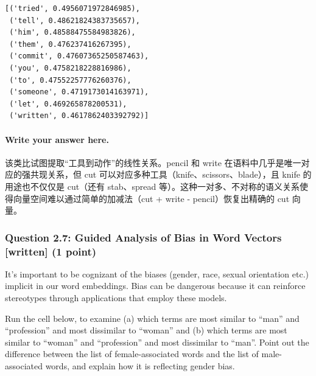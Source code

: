 \documentclass[11pt]{article}
\begin{document}
    \begin{Verbatim}[commandchars=\\\{\}]
[('tried', 0.4956071972846985),
 ('tell', 0.48621824383735657),
 ('him', 0.48588475584983826),
 ('them', 0.476237416267395),
 ('commit', 0.47607365250587463),
 ('you', 0.4758218228816986),
 ('to', 0.47552257776260376),
 ('someone', 0.4719173014163971),
 ('let', 0.469265878200531),
 ('written', 0.4617862403392792)]
    \end{Verbatim}

    \paragraph{Write your answer here.}\label{write-your-answer-here.}

该类比试图提取``工具到动作''的线性关系。pencil 和 write
在语料中几乎是唯一对应的强共现关系，但 cut
可以对应多种工具（knife、scissors、blade），且 knife 的用途也不仅仅是
cut（还有 stab、spread
等）。这种一对多、不对称的语义关系使得向量空间难以通过简单的加减法（cut
+ write - pencil）恢复出精确的 cut 向量。

    \subsubsection{Question 2.7: Guided Analysis of Bias in Word Vectors
{[}written{]} (1
point)}\label{question-2.7-guided-analysis-of-bias-in-word-vectors-written-1-point}

It's important to be cognizant of the biases (gender, race, sexual
orientation etc.) implicit in our word embeddings. Bias can be dangerous
because it can reinforce stereotypes through applications that employ
these models.

Run the cell below, to examine (a) which terms are most similar to
``man'' and ``profession'' and most dissimilar to ``woman'' and (b)
which terms are most similar to ``woman'' and ``profession'' and most
dissimilar to ``man''. Point out the difference between the list of
female-associated words and the list of male-associated words, and
explain how it is reflecting gender bias.
\end{document}
